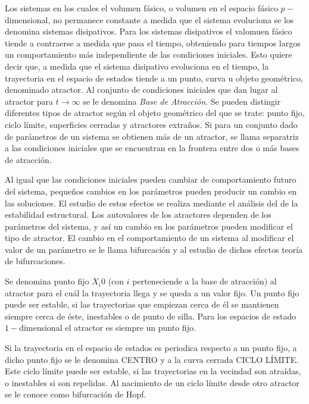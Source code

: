 Los sistemas en los cuales el volumen f\'asico, o volumen en el espacio f\'asico $p-$dimensional, no permanece constante a medida que el sistema evoluciona se los denomina sistemas disipativos. Para los sistemas disipativos el valomuen f\'asico tiende a contraerse a medida que pasa el tiempo, obteniendo para tiempos largos un comportamiento m\'as independiente de las condiciones iniciales. Esto quiere decir que, a medida que el sistema disipativo evoluciona en el tiempo, la trayectoria en el espacio de estados tiende a un punto, curva u objeto geom\'etrico, denominado atractor. Al conjunto de condiciones iniciales que dan lugar al atractor para $t \rightarrow \infty$ se le denomina \textit{Base de Atracci\'on}. Se pueden distingir diferentes tipos de atractor seg\'un el objeto geom\'etrico del que se trate: punto fijo, ciclo l\'imite, superficies cerradas y atractores extraños. Si para un conjunto dado de par\'ametros de un sistema se obtienen m\'as de un atractor, se llama separatriz a las condiciones iniciales que se encuentran en la frontera entre dos o m\'as bases de atracci\'on.

Al igual que las condiciones iniciales pueden cambiar de comportamiento futuro del sistema, pequeños cambios en los par\'ametros pueden producir un cambio en las soluciones. El estudio de estos efectos se realiza mediante el an\'alisis del de la estabilidad estructural. Los autovalores de los atractores dependen de los par\'ametros del sistema, y as\'i un cambio en los par\'ametros pueden modificar el tipo de atractor. El cambio en el comportamiento de un sistema al modificar el valor de un par\'ametro se le llama bifurcaci\'on y al estudio de dichos efectos teor\'ia de bifurcaciones.

Se denomina punto fijo $X_i0$ (con $i$ perteneciende a la base de atracci\'on) al atractor para el cu\'al la trayectoria llega y se queda a un valor fijo. Un punto fijo puede ser estable, si las trayectorias que empiezan cerca de \'el se mantienen siempre cerca de \'este, inestables o de punto de silla. Para los espacios de estado $1-$dimensional el atractor es siempre un punto fijo.

Si la trayectoria en el espacio de estados es periodica respecto a un punto fijo, a dicho punto fijo se le denomina CENTRO y a la curva cerrada CICLO L\'IMITE. Este ciclo l\'imite puede ser estable, si las trayectorias en la vecindad son atra\'idas, o inestables si son repelidas. Al nacimiento de un ciclo l\'imite desde otro atractor se le conoce como bifurcaci\'on de Hopf.

